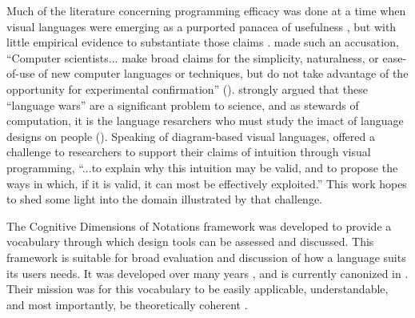 Much of the literature concerning programming efficacy was done at a time when visual languages were emerging as a purported panacea of usefulness \citep{shu-1988}, but with little empirical evidence to substantiate those claims \citep{petre-1995}. \citeauthor{sch-1980} made such an accusation, ``Computer scientists... make broad claims for the simplicity, naturalness, or ease-of-use of new computer languages or techniques, but do not take advantage of the opportunity for experimental confirmation'' (\citeyear{sch-1980}). \citeauthor{stefik2014programming} strongly argued that these ``language wars'' are a significant problem to science, and as stewards of computation, it is the language resarchers who must study the imact of language designs on people (\citeyear{stefik2014programming}). Speaking of diagram-based visual languages, \citet{blackwell-2001} offered a challenge to researchers to support their claims of intuition through visual programming, ``...to explain why this intuition may be valid, and to propose the ways in which, if it is valid, it can most be effectively exploited.'' This work hopes to shed some light into the domain illustrated by that challenge. 

\label{sec:CDs}
The Cognitive Dimensions of Notations framework was developed to provide a vocabulary through which design tools can be assessed and discussed. This framework is suitable for broad evaluation and discussion of how a language suits its users needs. It was developed over many years \citep{green1989cognitive, green1996usability}, and is currently canonized in \citet{blackwell-2003}. Their mission was for this vocabulary to be easily applicable, understandable, and most importantly, be theoretically coherent \citep{petre-2006}. 


